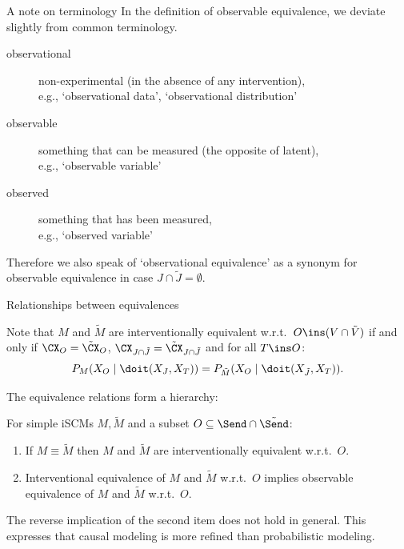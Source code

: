 \begin{frame}{A note on terminology}
%
  In the definition of observable equivalence, we deviate slightly from common terminology.

  \bigskip
  \begin{description}
    \item[observational] non-experimental (in the absence of any intervention),\\
      e.g., `observational data', `observational distribution'
    \item[observable] something that can be measured (the opposite of latent),\\
      e.g., `observable variable'
    \item[observed] something that has been measured,\\
      e.g., `observed variable'
  \end{description}

  \bigskip
  Therefore we also speak of `observational equivalence' as a synonym for observable equivalence in case $J \cap \tilde{J} = \emptyset$.
\end{frame}

\begin{frame}{Relationships between equivalences}
  \begin{Rem}[\ref{rem:scm_interv_equiv}]
  Note that $M$ and $\tilde{M}$ are interventionally equivalent w.r.t.\ $O \ins (V \cap \tilde{V})$ if and only if
  $\CX_O = \tilde{\CX}_O$, $\CX_{J \cap \tilde{J}} = \tilde{\CX}_{J \cap \tilde{J}}$
  and for all $T \ins O$:
    $$P_{M}(X_O \mid \doit(X_J,X_T)) = P_{\tilde{M}}(X_O \mid \doit(X_{\tilde J},X_T)).$$
\end{Rem}
The equivalence relations form a hierarchy:
  \begin{Prp}[\ref{prp:pearls_ladder_levels_1_and_2}]
  For simple iSCMs $M, \tilde{M}$ and a subset $O \subseteq \Send \cap \tilde{\Send}$:
  \begin{enumerate}
    \item If $M \equiv \tilde{M}$ then $M$ and $\tilde{M}$ are interventionally equivalent w.r.t.\ $O$.
    \item Interventional equivalence of $M$ and $\tilde{M}$ w.r.t.\ $O$ implies observable equivalence of $M$ and $\tilde{M}$ w.r.t.\ $O$.
  \end{enumerate}
\end{Prp}
The reverse implication of the second item does not hold in general. 
This expresses that causal modeling is more refined than probabilistic modeling.
\end{frame}

